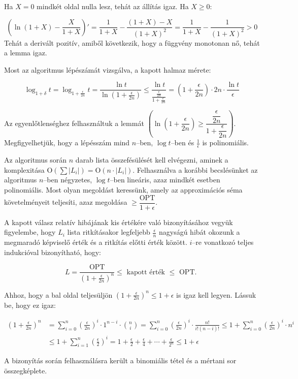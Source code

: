 Ha $X=0$ mindkét oldal nulla lesz, tehát az állítás igaz. Ha $X \geq 0$:

\[ \left( \ln{(1+X)} - \frac{X}{1+X}\right)' = \frac{1}{1+X} - \frac{(1+X)-X}{(1+X)^2} =
\frac{1}{1+X} - \frac{1}{(1+X)^2} > 0 
\]
Tehát a derivált pozitív, amiből következik, hogy a függvény monotonan nő, tehát
a lemma igaz.

Most az algoritmus lépészámát vizsgálva, a kapott halmaz mérete:

\[ \log_{1+\delta}{t}=\log_{1+\frac{\epsilon}{2n} }{t} = \frac{\ln{t}}{\ln(1+\frac{\epsilon}{2n})}
\leq \frac{\ln{t}}{\frac{\frac{\epsilon}{2n}}{1+\frac{\epsilon}{2n}}} 
= \left(1 + \frac{\epsilon}{2n} \right) \cdot 2n \cdot \frac{\ln{t}}{\epsilon} \]

Az egyenlőtlenséghez felhasználtuk a lemmát $\left(\ln(1+\dfrac{\epsilon}{2n})
\geq \dfrac{\dfrac{\epsilon}{2n}}{1+\dfrac{\epsilon}{2n}}\right)$.
Megfigyelhetjük, hogy a lépésszám mind $n$--ben, $\log t$--ben és
$\frac{1}{\epsilon}$ is polinomiális.

Az algoritmus során $n$ darab lista összefésülését kell elvégezni, aminek a
komplexitása O$(\sum |L_i|)=$O$(n \cdot |L_i|)$. Felhasználva a korábbi
becslésünket az algoritmus $n$--ben négyzetes, $\log{t}$--ben lineáris, azaz
mindkét esetben polinomiális. Most olyan megoldást keressünk, amely az
approximációs séma követelményeit teljesíti, azaz megoldása $\geq
\dfrac{\mbox{OPT}}{1+\epsilon}$.

A kapott válasz relatív hibájának kis értékére való bizonyításához vegyük
figyelembe, hogy $L_i$ lista ritkításakor legfeljebb $\frac{\epsilon}{n}$
nagyságú hibát okozunk a megmaradó képviselő érték és a ritkítás előtti érték
között. $i$--re vonatkozó teljes indukcióval bizonyítható, hogy:

\[ L = \frac{\mbox{OPT}}{(1+ \frac{\epsilon}{2n})^n} \leq \mbox{ kapott érték }
\leq \mbox{ OPT. }\]

Ahhoz, hogy a bal oldal teljesüljön $(1+\frac{\epsilon}{2n})^n \leq 1 + \epsilon$ 
is igaz kell legyen. Lássuk be, hogy ez igaz:

\begin{align*}
\left(1+\frac{\epsilon}{2n}\right)^n &= 
\sum_{i=0}^{n}\left(\frac{\epsilon}{2n}\right)^i \cdot 1^{n-i} \cdot \binom{n}{i} = 
 \sum_{i=0}^{n}\left(\frac{\epsilon}{2n}\right)^i \cdot \frac{n!}{i!(n-i)!}
 \leq 1 + \sum_{i=0}^{n}\left(\frac{\epsilon}{2n}\right)^i \cdot n^i \\
 &\leq 1 + \sum_{i=1}^{n}\left(\frac{\epsilon}{2}\right)^i = 1 + \frac{\epsilon}{2}
 + \frac{\epsilon}{4} + \cdots + \frac{\epsilon}{2^n} \leq 1 + \epsilon
\end{align*}

A bizonyítás során felhasználásra került a binomiális tétel és a mértani sor
összegképlete.
